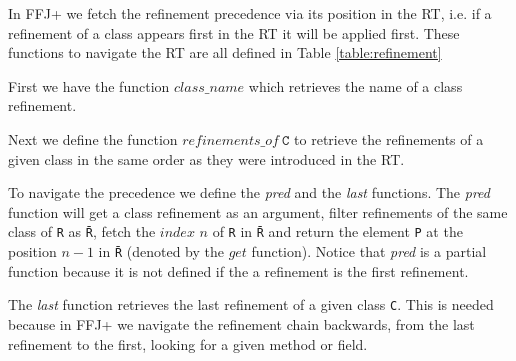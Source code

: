 In \ac{FFJ+} we fetch the refinement precedence via its position in the \textsf{RT}, i.e.
if a refinement of a class appears first in the \textsf{RT} it will be applied first. 
These functions to navigate the \textsf{RT} are all defined in Table \ref{table:refinement}
    
First we have the function $class\_name$ which retrieves the name of a class refinement.

Next we define the function $refinements\_of~\texttt{C}$ to retrieve the refinements of 
a given class in the same order as they were introduced in the \textsf{RT}.

To navigate the precedence we define the \textit{pred} and the \textit{last} functions.
The \textit{pred} function will get a class refinement as an argument,
filter refinements of the same class of \texttt{R} as \texttt{\=R}, fetch the $index$ $n$ of \texttt{R} in \texttt{\=R} 
and return the element \texttt{P} at the position $n-1$ in \texttt{\=R} (denoted by the $get$ function). Notice that \textit{pred} is a partial function
because it is not defined if the a refinement is the first refinement.

The \textit{last} function retrieves the last refinement of a given class \texttt{C}.
This is needed because in \ac{FFJ+} we navigate the refinement chain backwards, from the last refinement
to the first, looking for a given method or field. 

